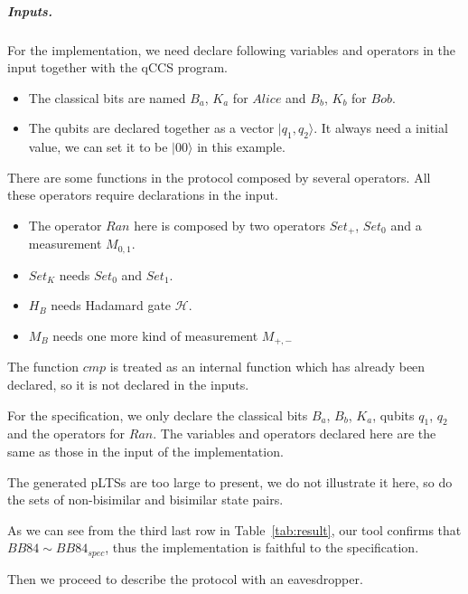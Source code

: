 \documentclass[a4paper,UKenglish,cleveref, autoref]{lipics-v2019}
\begin{document}
\subparagraph*{Inputs.}
For the implementation, we need declare following variables and operators in the input together with the qCCS program.
\begin{itemize}
    \item The classical bits are named $B_a$, $K_a$ for $Alice$ and $B_b$, $K_b$ for $Bob$.
    \item The qubits are declared together as a vector $|q_1,q_2\rangle$. It always need a initial value, we can set it to be $|00\rangle$ in this example.
\end{itemize}
There are some functions in the protocol composed by several operators. All these operators require declarations in the input. 
\begin{itemize}
    \item The operator $Ran$ here is composed by two operators $Set_{+}$, $Set_{0}$ and a measurement $M_{0,1}$. 
    \item $Set_{K}$ needs $Set_{0}$ and $Set_{1}$.
    \item $H_{B}$ needs Hadamard gate $\mathcal{H}$.
    \item $M_{B}$ needs one more kind of measurement $M_{+,-}$
\end{itemize}
The function $cmp$ is treated as an internal function which has already been declared, so it is not declared in the inputs.

For the specification, we only declare the classical bits $B_a$, $B_b$, $K_a$, qubits $q_1$, $q_2$ and the operators for $Ran$. The variables and operators declared here are the same as those in the input of the implementation.

The generated pLTSs are too large to present, we do not illustrate it here, so do the sets of non-bisimilar and bisimilar state pairs. 

As we can see from the third last row in Table~\ref{tab:result}, our tool confirms that $BB84 \sim BB84_{spec}$, thus the implementation is faithful to the specification.

Then we proceed to describe the protocol with an eavesdropper. 
\end{document}
